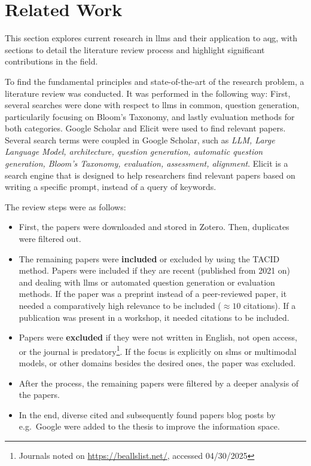 \section{Related Work} \label{sec:related-work}

This section explores current research in \acp{llm} and their application to \ac{aqg}, with sections to detail the literature review process and highlight significant contributions in the field.

 To find the fundamental principles and state-of-the-art of the research problem, a literature review was conducted. It was performed in the following way: First, several searches were done with respect to \acp{llm} in common, question generation, particularily focusing on Bloom's Taxonomy, and lastly evaluation methods for both categories. Google Scholar and Elicit were used to find relevant papers. Several search terms were coupled in Google Scholar, such as \textit{LLM, Large Language Model, architecture, question generation, automatic question generation, Bloom's Taxonomy, evaluation, assessment, alignment}. Elicit is a search engine that is designed to help researchers find relevant papers based on writing a specific prompt, instead of a query of keywords.

 The review steps were as follows: 
\begin{itemize}
    \item First, the papers were downloaded and stored in Zotero. Then, duplicates were filtered out.
    \item The remaining papers were \textbf{included} or excluded by using the TACID method. Papers were included if they are recent (published from 2021 on) and dealing with \acp{llm} or automated question generation or evaluation methods. If the paper was a preprint instead of a peer-reviewed paper, it needed a comparatively high relevance to be included ($\approx 10$ citations). If a publication was present in a workshop, it needed citations to be included.
    \item Papers were \textbf{excluded} if they were not written in English, not open access, or the journal is predatory\footnote{Journals noted on \url{https://beallslist.net/}, accessed 04/30/2025}. If the focus is explicitly on \acp{slm} or multimodal models, or other domains besides the desired ones, the paper was excluded. 
    \item After the process, the remaining papers were filtered by a deeper analysis of the papers.
    \item In the end, diverse cited and subsequently found papers blog posts by e.g.\ Google were added to the thesis to improve the information space.
\end{itemize}

